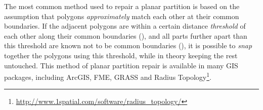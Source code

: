 The most common method used to repair a planar partition is based on the assumption that polygons \emph{approximately} match each other at their common boundaries.
If the adjacent polygons are within a certain distance \emph{threshold} of each other along their common boundaries (), and all parts further apart than this threshold are known not to be common boundaries (), it is possible to \emph{snap} together the polygons using this threshold, while in theory keeping the rest untouched.
This method of planar partition repair is available in many GIS packages, including ArcGIS, FME, GRASS and Radius Topology\footnote{\url{http://www.1spatial.com/software/radius_topology/}}.

